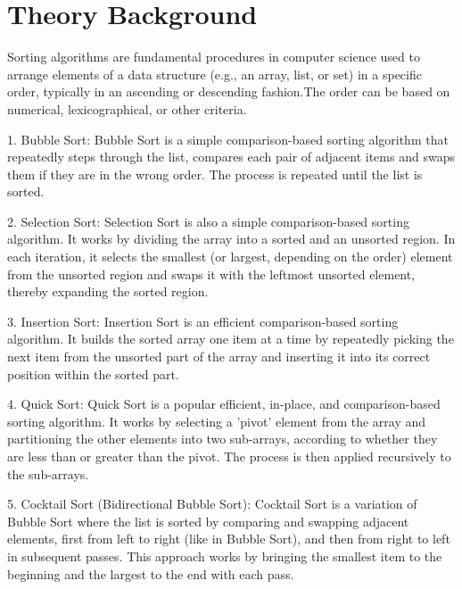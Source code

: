 \documentclass[12pt]{article}
\begin{document}
\setcounter{page}{2}
\pagestyle{fancy}
\fancyhf{}
\rhead{\thepage}

\section*{Theory Background}
\hspace{0.8cm}Sorting algorithms are fundamental procedures in computer science used to arrange elements of a data structure (e.g., an array, list, or set) in a specific order, typically in an ascending or descending fashion.The order can be based on numerical, lexicographical, or other criteria.

1. Bubble Sort:
Bubble Sort is a simple comparison-based sorting algorithm that repeatedly steps through the list, compares each pair of adjacent items and swaps them if they are in the wrong order. The process is repeated until the list is sorted.

2. Selection Sort:
Selection Sort is also a simple comparison-based sorting algorithm. It works by dividing the array into a sorted and an unsorted region. In each iteration, it selects the smallest (or largest, depending on the order) element from the unsorted region and swaps it with the leftmost unsorted element, thereby expanding the sorted region.

3. Insertion Sort:
Insertion Sort is an efficient comparison-based sorting algorithm. It builds the sorted array one item at a time by repeatedly picking the next item from the unsorted part of the array and inserting it into its correct position within the sorted part.

4. Quick Sort:
Quick Sort is a popular efficient, in-place, and comparison-based sorting algorithm. It works by selecting a 'pivot' element from the array and partitioning the other elements into two sub-arrays, according to whether they are less than or greater than the pivot. The process is then applied recursively to the sub-arrays.

5. Cocktail Sort (Bidirectional Bubble Sort):
Cocktail Sort is a variation of Bubble Sort where the list is sorted by comparing and swapping adjacent elements, first from left to right (like in Bubble Sort), and then from right to left in subsequent passes. This approach works by bringing the smallest item to the beginning and the largest to the end with each pass.
\end{document}
